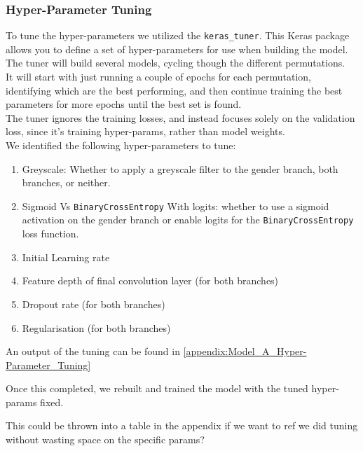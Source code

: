 \begin{optional}
    \subsubsection{Hyper-Parameter Tuning}
    To tune the hyper-parameters we utilized the \verb|keras_tuner|.
    This Keras package allows you to define a set of hyper-parameters for use when building the model. 
    The tuner will build several models, cycling though the different permutations.\\
    It will start with just running a couple of epochs for each permutation, identifying which are the best performing, and then continue training the best parameters for more epochs until the best set is found.\\
    The tuner ignores the training losses, and instead focuses solely on the validation loss, since it's training hyper-params, rather than model weights.\\
    We identified the following hyper-parameters to tune:
    \begin{enumerate}
        \item Greyscale: Whether to apply a greyscale filter to the gender branch, both branches, or neither.
        \item Sigmoid Vs \verb|BinaryCrossEntropy| With logits: whether to use a sigmoid activation on the gender branch or enable logits for the \verb|BinaryCrossEntropy| loss function.
        \item Initial Learning rate
        \item Feature depth of final convolution layer (for both branches)
        \item Dropout rate (for both branches)
        \item Regularisation (for both branches)
    \end{enumerate}
    An output of the tuning can be found in \autoref{appendix:Model_A_Hyper-Parameter_Tuning}

    Once this completed, we rebuilt and trained the model with the tuned hyper-params fixed.\\
    \begin{notes}
        This could be thrown into a table in the appendix if we want to ref we did tuning without wasting space on the specific params?
    \end{notes}
\end{optional}

